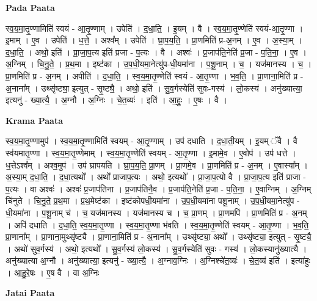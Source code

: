 \documentclass[17pt]{extarticle}
\begin{document}
\textbf{Pada Paata} \newline

स्व॒य॒मा॒तृ॒ण्णामिति॑ स्वयं - आ॒तृ॒ण्णाम् । उपेति॑ । द॒धा॒ति॒ । इ॒यम् । वै । स्व॒य॒मा॒तृ॒ण्णेति॑ स्वयं-आ॒तृ॒ण्णा । इ॒माम् । ए॒व । उपेति॑ । ध॒त्ते॒ । अश्व᳚म् । उपेति॑ । घ्रा॒प॒य॒ति॒ । प्रा॒णमिति॑ प्र-अ॒नम् । ए॒व । अ॒स्या॒म् । द॒धा॒ति॒ । अथो॒ इति॑ । प्रा॒जा॒प॒त्य इति॑ प्रजा - प॒त्यः । वै । अश्वः॑ । प्र॒जाप॑ति॒नेति॑ प्र॒जा - प॒ति॒ना॒ । ए॒व । अ॒ग्निम् । चि॒नु॒ते॒ । प्र॒थ॒मा । इष्ट॑का । उ॒प॒धी॒यमा॒नेत्यु॑प-धी॒यमा॑ना । प॒शू॒नाम् । च॒ । यज॑मानस्य । च॒ । प्रा॒णमिति॑ प्र - अ॒नम् । अपीति॑ । द॒धा॒ति॒ । स्व॒य॒मा॒तृ॒ण्णेति॑ स्वयं - आ॒तृ॒ण्णा । भ॒व॒ति॒ । प्रा॒णाना॒मिति॑ प्र - अ॒नाना᳚म् । उथ्सृ॑ष्ट्या॒ इत्युत् - सृ॒ष्ट्यै॒ । अथो॒ इति॑ । सु॒व॒र्गस्येति॑ सुवः-गस्य॑ । लो॒कस्य॑ । अनु॑ख्यात्या॒ इत्यनु॑ - ख्या॒त्यै॒ । अ॒ग्नौ । अ॒ग्निः । चे॒त॒व्यः॑ । इति॑ । आ॒हुः॒ । ए॒षः । वै ।  \newline


\textbf{Krama Paata} \newline

स्व॒य॒मा॒तृ॒ण्णामुप॑ । स्व॒य॒मा॒तृ॒ण्णामिति॑ स्वयम् - आ॒तृ॒ण्णाम् । उप॑ दधाति । द॒धा॒ती॒यम् । इ॒यम् ॅवै । वै स्व॑यमातृ॒ण्णा । स्व॒य॒मा॒तृ॒ण्णेमाम् । स्व॒य॒मा॒तृ॒ण्णेति॑ स्वयम् - आ॒तृ॒ण्णा । इ॒मामे॒व । ए॒वोप॑ । उप॑ धत्ते । ध॒त्तेऽश्व᳚म् । अश्व॒मुप॑ । उप॑ घ्रापयति । घ्रा॒प॒य॒ति॒ प्रा॒णम् । प्रा॒णमे॒व । प्रा॒णमिति॑ प्र - अ॒नम् । ए॒वास्या᳚म् । अ॒स्या॒म् द॒धा॒ति॒ । द॒धा॒त्यथो᳚ । अथो᳚ प्राजाप॒त्यः । अथो॒ इत्यथो᳚ । प्रा॒जा॒प॒त्यो वै । प्रा॒जा॒प॒त्य इति॑ प्राजा - प॒त्यः । वा अश्वः॑ । अश्वः॑ प्र॒जाप॑तिना । प्र॒जाप॑तिनै॒व । प्र॒जाप॑ति॒नेति॑ प्र॒जा - प॒ति॒ना॒ । ए॒वाग्निम् । अ॒ग्निम् चि॑नुते । चि॒नु॒ते॒ प्र॒थ॒मा । प्र॒थ॒मेष्ट॑का । इष्ट॑कोपधी॒यमा॑ना । उ॒प॒धी॒यमा॑ना पशू॒नाम् । उ॒प॒धी॒यमा॒नेत्यु॑प - धी॒यमा॑ना । प॒शू॒नाम् च॑ । च॒ यज॑मानस्य । यज॑मानस्य च । च॒ प्रा॒णम् । प्रा॒णमपि॑ । प्रा॒णमिति॑ प्र - अ॒नम् । अपि॑ दधाति । द॒धा॒ति॒ स्व॒य॒मा॒तृ॒ण्णा । स्व॒य॒मा॒तृ॒ण्णा भ॑वति । स्व॒य॒मा॒तृ॒ण्णेति॑ स्वयम् - आ॒तृ॒ण्णा । भ॒व॒ति॒ प्रा॒णाना᳚म् । प्रा॒णाना॒मुथ्सृ॑ष्ट्यै । प्रा॒णाना॒मिति॑ प्र - अ॒नाना᳚म् । उथ्सृ॑ष्ट्या॒ अथो᳚ । उथ्सृ॑ष्ट्या॒ इत्युत् - सृ॒ष्ट्यै॒ । अथो॑ सुव॒र्गस्य॑ । अथो॒ इत्यथो᳚ । सु॒व॒र्गस्य॑ लो॒कस्य॑ । सु॒व॒र्गस्येति॑ सुवः - गस्य॑ । लो॒कस्यानु॑ख्यात्यै । अनु॑ख्यात्या अ॒ग्नौ । अनु॑ख्यात्या॒ इत्यनु॑ - ख्या॒त्यै॒ । अ॒ग्नाव॒ग्निः । अ॒ग्निश्चे॑त॒व्यः॑ । चे॒त॒व्य॑ इति॑ । इत्या॑हुः । आ॒हु॒रे॒षः । ए॒ष वै । वा अ॒ग्निः \newline

\textbf{Jatai Paata} \newline
\end{document}
